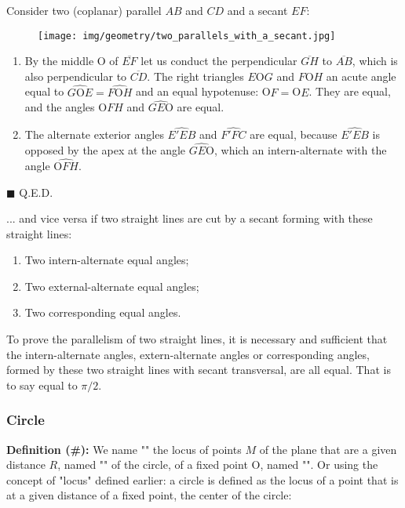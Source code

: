 	\begin{dem}
	Consider two (coplanar) parallel $AB$ and $CD$ and a secant $EF$:
	\begin{figure}[H]
		\centering
		\texttt{[image: img/geometry/two\_parallels\_with\_a\_secant.jpg]}
	\end{figure}
	\begin{enumerate}
		\item By the middle O of $\overline{EF}$ let us conduct the perpendicular $\overline{GH}$ to $\overline{AB}$, which is also perpendicular to $\overline{CD}$. The right triangles $E$O$G$ and $F$O$H$ an acute angle equal to $\widehat{G\text{O}E}=\widehat{F\text{O}H}$ and an equal hypotenuse: O$F = $O$E$. They are equal, and the angles $\widehat{\text{O}FH}$ and $\widehat{GE\text{O}}$ are equal.

		\item The alternate exterior angles $\widehat{E'EB}$ and $\widehat{F'FC}$ are equal, because $\widehat{E'EB}$ is opposed by the apex at the angle $\widehat{GE\text{O}}$, which an intern-alternate with the angle $\widehat{\text{O}FH}$.
	\end{enumerate}
	\begin{flushright}
		$\blacksquare$  Q.E.D.
	\end{flushright}
	\end{dem}
	... and vice versa if two straight lines are cut by a secant forming with these straight lines:
	\begin{enumerate}
		\item Two intern-alternate equal angles;
		\item Two external-alternate equal angles;
		\item Two corresponding equal angles.
	\end{enumerate} 
	\begin{tcolorbox}[title=Remark,colframe=black,arc=10pt]
	To prove the parallelism of two straight lines, it is necessary and sufficient that the intern-alternate angles, extern-alternate angles or corresponding angles, formed by these two straight lines with secant transversal, are all equal. That is to say equal to $\pi/2$.
	\end{tcolorbox}
	
	\pagebreak
	\subsubsection{Circle}\label{circle}
	\textbf{Definition (\#\mydef):} We name "" the locus of points $M$ of the plane that are a given distance $R$, named "" of the circle, of a fixed point O, named "". Or using the concept of "locus" defined earlier:  a circle is defined as the locus of a point that is at a given distance of a fixed point, the center of the circle:
	
